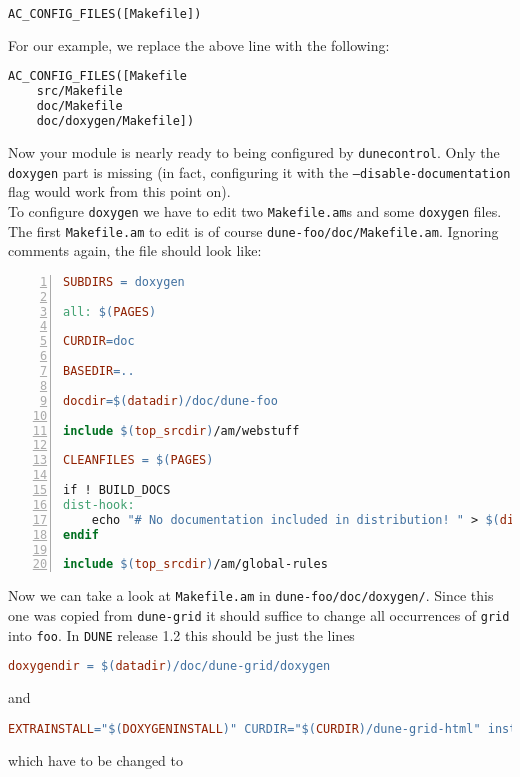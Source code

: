 \documentclass[11pt,a4paper,headinclude,footinclude,DIV16,normalheadings]{scrartcl}
\newcommand{\dune}{\texttt{DUNE}\xspace}
\newcommand{\makefileam}{\texttt{Makefile.am}\xspace}
\newcommand{\dunegrid}{\texttt{dune-grid}\xspace}
\newcommand{\dunecontrol}{\texttt{dunecontrol}\xspace}
\begin{document}
\begin{lstlisting}[language=make]
AC_CONFIG_FILES([Makefile])
\end{lstlisting}
For our example, we replace the above line with the following:

\begin{lstlisting}[language=make]
AC_CONFIG_FILES([Makefile
    src/Makefile
    doc/Makefile
    doc/doxygen/Makefile])
\end{lstlisting}

Now your module is nearly ready to being configured by \dunecontrol. Only the 
\texttt{doxygen} part is missing (in fact, configuring it with the
\texttt{--disable-documentation} flag would work from this point on).\\

To configure \texttt{doxygen} we have to edit two \texttt{Makefile.am}s and some
\texttt{doxygen} files. The first \makefileam to edit is of course
\texttt{dune-foo/doc/Makefile.am}. Ignoring comments again, the file should
look like:

\begin{lstlisting}[numbers=left,numberstyle=\tiny,numbersep=5pt,language=make]
SUBDIRS = doxygen

all: $(PAGES)

CURDIR=doc

BASEDIR=..

docdir=$(datadir)/doc/dune-foo

include $(top_srcdir)/am/webstuff

CLEANFILES = $(PAGES)

if ! BUILD_DOCS
dist-hook:
	echo "# No documentation included in distribution! " > $(distdir)/$(DOCUMENTATION_TAG_FILE)
endif

include $(top_srcdir)/am/global-rules
\end{lstlisting}

Now we can take a look at \makefileam in \texttt{dune-foo/doc/doxygen/}.
Since this one was copied from \dunegrid it should suffice to change all
occurrences of \texttt{grid} into \texttt{foo}. In \dune release 1.2 this
should be just the lines

\begin{lstlisting}[language=make]
doxygendir = $(datadir)/doc/dune-grid/doxygen
\end{lstlisting}
and

\begin{lstlisting}[language=make]
EXTRAINSTALL="$(DOXYGENINSTALL)" CURDIR="$(CURDIR)/dune-grid-html" install ; \
\end{lstlisting}
which have to be changed to 
\end{document}

